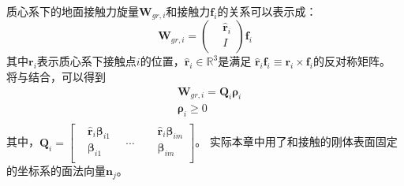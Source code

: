 质心系下的地面接触力旋量${{\boldsymbol{W}}_{gr,i}}$和接触力${{\boldsymbol{f}}_{i}}$的关系可以表示成：
\begin{equation}
    \label{equ:contact_wrench}
    {\boldsymbol{W}_{gr,i}}=\left( \begin{aligned}
        & {{{\hat{\boldsymbol{r}}}}_{i}} \\ 
       & I \\ 
      \end{aligned} \right){\boldsymbol{f}_{i}}      
\end{equation}
其中${\boldsymbol{r}_{i}}$表示质心系下接触点$i$的位置，${{\hat{\boldsymbol{r}}}_{i}}\in {{\mathbb{R}}^{3}}$是满足
${{\hat{\boldsymbol{r}}}_{i}}{\boldsymbol{f}_{i}}\equiv {\boldsymbol{r}_{i}}\times {\boldsymbol{f}_{i}}$的反对称矩阵。
将与结合，可以得到
\begin{equation}
    \label{equ:wrench_matrix}
    \begin{aligned}
        & {{\boldsymbol{W}}_{gr,i}}={{\boldsymbol{Q}}_{i}}{{\boldsymbol{\rho}}_{i}} \\ 
       & {{\boldsymbol{\rho}}_{i}}\ge 0 \\ 
      \end{aligned}        
\end{equation}
其中，${{\boldsymbol{Q}}_{i}}=\left[ \begin{aligned}
    & {{{\hat{\boldsymbol{r}}}}_{i}}{{\boldsymbol{\beta}}_{i1}} \\ 
   & {{\boldsymbol{\beta}}_{i1}}\ \ \ \  \\ 
  \end{aligned} \right.\ \ \ \ \cdots \ \ \ \ \left. \begin{aligned}
    & {{{\hat{\boldsymbol{r}}}}_{i}}{{\boldsymbol{\beta}}_{im}} \\ 
   & {{\boldsymbol{\beta}}_{im}} \\ 
  \end{aligned} \right]
  $。
  实际本章中用了和接触的刚体表面固定的坐标系的面法向量${{\boldsymbol{n}}_{j}}$。
